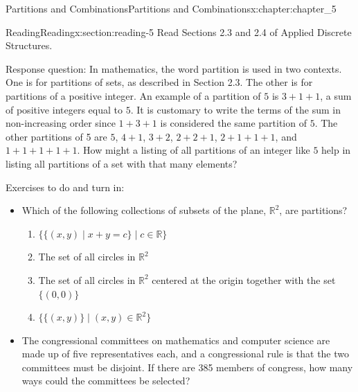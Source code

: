\documentclass[oneside,10pt,]{book}
\numberwithin{equation}{section}
\begin{document}
%
%
\typeout{************************************************}
\typeout{************************************************}
%
\begin{chapterptx}{Partitions and Combinations}{}{Partitions and Combinations}{}{}{x:chapter:chapter_5}
%
%
%
\typeout{************************************************}
\typeout{************************************************}
%
\begin{sectionptx}{Reading}{}{Reading}{}{}{x:section:reading-5}
Read Sections 2.3 and 2.4 of Applied Discrete Structures.%
\par
Response question: In mathematics, the word partition is used in two contexts. One is for partitions of sets, as described in Section 2.3. The other is for partitions of a positive integer.  An example of a partition of \(5\) is \(3+1+1\), a sum of positive integers equal to \(5\). It is customary to write the terms of the sum in non-increasing order since \(1+3+1\) is considered the same partition of \(5\). The other partitions of 5 are \(5\), \(4+1\), \(3+2\), \(2+2+1\), \(2+1+1+1\), and \(1+1+1+1+1\). How might a listing of all partitions of an integer like \(5\) help in listing all partitions of a set with that many elements?%
\par
Exercises to do and turn in:%
\begin{itemize}[label=\textbullet]
\item{}Which of the following collections of subsets of the plane, \(\mathbb{R}^2\), are partitions?%
\begin{enumerate}[label=(\alph*)]
\item{}\(\{ \{(x, y) \mid x + y = c \} \mid c \in \mathbb{R} \}\)%
\item{}The set of all circles in \(\mathbb{R}^2 \)%
\item{}The set of all circles in \(\mathbb{R}^2\) centered at the origin together with the set \(\{(0,0)\}\)%
\item{}\(\{\{(x, y)\} \mid (x, y) \in \mathbb{R}^2  \} \)%
\end{enumerate}
%
\item{}The congressional committees on mathematics and computer science are made up of five representatives each, and a congressional rule is that the two committees must be disjoint. If there are 385 members of congress, how many ways could the committees be selected?%
\end{itemize}
%
\end{sectionptx}

\end{chapterptx}
\end{document}
